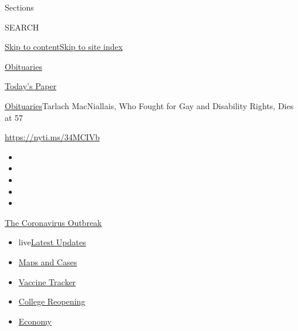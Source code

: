 Sections

SEARCH

\protect\hyperlink{site-content}{Skip to
content}\protect\hyperlink{site-index}{Skip to site index}

\href{https://www.nytimes.com/section/obituaries}{Obituaries}

\href{https://myaccount.nytimes.com/auth/login?response_type=cookie\&client_id=vi}{}

\href{https://www.nytimes.com/section/todayspaper}{Today's Paper}

\href{/section/obituaries}{Obituaries}\textbar{}Tarlach MacNiallais, Who
Fought for Gay and Disability Rights, Dies at 57

\url{https://nyti.ms/34MCIVb}

\begin{itemize}
\item
\item
\item
\item
\item
\end{itemize}

\href{https://www.nytimes.com/news-event/coronavirus?action=click\&pgtype=Article\&state=default\&region=TOP_BANNER\&context=storylines_menu}{The
Coronavirus Outbreak}

\begin{itemize}
\tightlist
\item
  live\href{https://www.nytimes.com/2020/08/03/world/coronavirus-covid-19.html?action=click\&pgtype=Article\&state=default\&region=TOP_BANNER\&context=storylines_menu}{Latest
  Updates}
\item
  \href{https://www.nytimes.com/interactive/2020/us/coronavirus-us-cases.html?action=click\&pgtype=Article\&state=default\&region=TOP_BANNER\&context=storylines_menu}{Maps
  and Cases}
\item
  \href{https://www.nytimes.com/interactive/2020/science/coronavirus-vaccine-tracker.html?action=click\&pgtype=Article\&state=default\&region=TOP_BANNER\&context=storylines_menu}{Vaccine
  Tracker}
\item
  \href{https://www.nytimes.com/2020/08/02/us/covid-college-reopening.html?action=click\&pgtype=Article\&state=default\&region=TOP_BANNER\&context=storylines_menu}{College
  Reopening}
\item
  \href{https://www.nytimes.com/live/2020/08/03/business/stock-market-today-coronavirus?action=click\&pgtype=Article\&state=default\&region=TOP_BANNER\&context=storylines_menu}{Economy}
\end{itemize}

